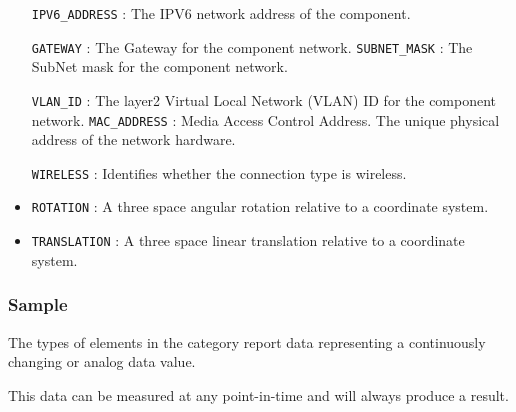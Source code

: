 \begin{itemize}
\newline\tab \texttt{IPV6_ADDRESS} : The IPV6 network address of the component.
 
\newline\tab \texttt{GATEWAY} : The Gateway for the component network. 
\newline\tab \texttt{SUBNET_MASK} : The SubNet mask for the component network.
 
\newline\tab \texttt{VLAN_ID} : The layer2 Virtual Local Network (VLAN) ID for the component network. 
\newline\tab \texttt{MAC_ADDRESS} : Media Access Control Address. The unique physical address of the network hardware.
 
\newline\tab \texttt{WIRELESS} : Identifies whether the connection type is wireless. 
\item \texttt{ROTATION} : A three space angular rotation relative to a coordinate system. 

\item \texttt{TRANSLATION} : A three space linear translation relative to a coordinate system. 

\end{itemize}

\FloatBarrier

\subsubsection{Sample}
  \label{sec:Sample}


The types of  elements in the  category report data representing a continuously changing or analog data value.

This data can be measured at any point-in-time and will always produce a result.


